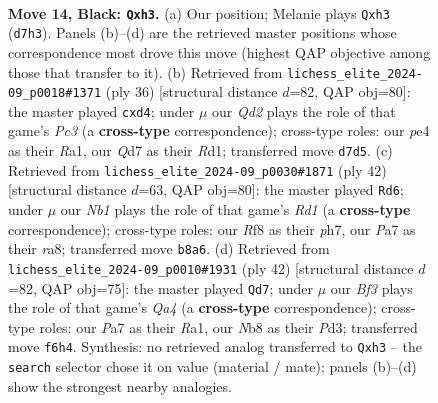 \documentclass[11pt]{article}
\begin{document}
\clearpage

\begin{figure}[p]\centering
\begin{subfigure}{0.46\textwidth}\centering
\resizebox{\linewidth}{!}{%
\newchessgame
\chessboard[
  setfen={rn3rk1/p1pqpp1p/5bp1/3P4/2Q1P3/B1P4P/P4P1P/R4RK1 b - - 2 14},
  showmover=false,
  pgfstyle=straightmove, color=movearrow, markmove={d7-h3}
]}
\caption{}
\end{subfigure}\hfill
\begin{subfigure}{0.46\textwidth}\centering
\resizebox{\linewidth}{!}{%
\newchessgame
\chessboard[
  setfen={r4rk1/pp3p1p/1q4p1/4b3/3p4/1PP2Q1P/P4PP1/RN1R2K1 w - - 0 19},
  showmover=false,
  pgfstyle=straightmove, color=movearrow, markmove={c3-d4}
]}
\caption{}
\end{subfigure}
\\[4pt]
\begin{subfigure}{0.46\textwidth}\centering
\resizebox{\linewidth}{!}{%
\newchessgame
\chessboard[
  setfen={r1r3k1/ppq3pp/4bp2/4p3/1Q2p3/P1P1P1BP/5PP1/R2R2K1 w - - 0 22},
  showmover=false,
  pgfstyle=straightmove, color=movearrow, markmove={d1-d6}
]}
\caption{}
\end{subfigure}\hfill
\begin{subfigure}{0.46\textwidth}\centering
\resizebox{\linewidth}{!}{%
\newchessgame
\chessboard[
  setfen={r4rk1/pp2bppp/1q2p3/4P3/Q2p1P2/3P2P1/1P3RBP/R5K1 w - - 2 22},
  showmover=false,
  pgfstyle=straightmove, color=movearrow, markmove={a4-d7}
]}
\caption{}
\end{subfigure}
\caption{\textbf{Move 14, Black: \texttt{Qxh3}.} (a) Our position; Melanie plays \texttt{Qxh3} (\texttt{d7h3}). Panels (b)--(d) are the retrieved master positions whose correspondence most drove this move (highest QAP objective among those that transfer to it). (b) Retrieved from \texttt{lichess\_elite\_2024-09\_p0018\#1371} (ply 36) [structural distance $d$=82, QAP obj=80]: the master played \texttt{cxd4}; under $\mu$ our \emph{Qd2} plays the role of that game's \emph{Pc3} (a \textbf{cross-type} correspondence); cross-type roles: our \emph{p}e4 as their \emph{R}a1, our \emph{Q}d7 as their \emph{R}d1; transferred move \texttt{d7d5}. (c) Retrieved from \texttt{lichess\_elite\_2024-09\_p0030\#1871} (ply 42) [structural distance $d$=63, QAP obj=80]: the master played \texttt{Rd6}; under $\mu$ our \emph{Nb1} plays the role of that game's \emph{Rd1} (a \textbf{cross-type} correspondence); cross-type roles: our \emph{R}f8 as their \emph{p}h7, our \emph{P}a7 as their \emph{r}a8; transferred move \texttt{b8a6}. (d) Retrieved from \texttt{lichess\_elite\_2024-09\_p0010\#1931} (ply 42) [structural distance $d$=82, QAP obj=75]: the master played \texttt{Qd7}; under $\mu$ our \emph{Bf3} plays the role of that game's \emph{Qa4} (a \textbf{cross-type} correspondence); cross-type roles: our \emph{P}a7 as their \emph{R}a1, our \emph{N}b8 as their \emph{P}d3; transferred move \texttt{f6h4}. Synthesis: no retrieved analog transferred to \texttt{Qxh3} -- the \texttt{search} selector chose it on value (material / mate); panels (b)--(d) show the strongest nearby analogies.}
\label{fig:thought-m27}
\end{figure}
\end{document}
